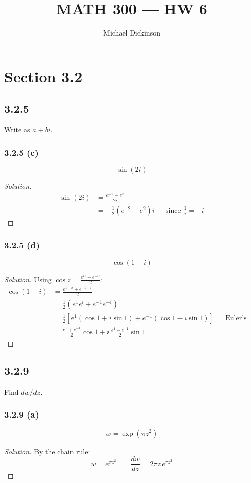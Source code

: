 \documentclass{article}
\title{MATH 300 --- HW 6}
\author{Michael Dickinson}
\date{}
\newenvironment{solution}{
\begin{proof}[Solution]}{
\end{proof}}
\begin{document}
\maketitle

\section*{Section 3.2}

\subsection*{3.2.5}
Write as $a + bi$.

\subsubsection*{3.2.5 (c)}
\[ \sin(2i) \]
\begin{solution}
  \begin{align*}
    \sin(2i) & = \frac{e^{-2}-e^{2}}{2i} \\
    & = -\frac{1}{2}\left(e^{-2}-e^{2}\right)i && \text{since } \frac{1}{i}=-i
  \end{align*}
\end{solution}

\subsubsection*{3.2.5 (d)}
\[ \cos(1 - i) \]
\begin{solution}
  Using $\cos z=\frac{e^{iz}+e^{-iz}}{2}$:
  \begin{align*}
    \cos(1-i) & = \frac{e^{1+i}+e^{-1-i}}{2} \\
    & = \frac{1}{2}\left(e^{1}e^{i}+e^{-1}e^{-i}\right) \\
    & = \frac{1}{2}\left[e^{1}(\cos 1+i\sin 1)+e^{-1}(\cos 1-i\sin 1)\right] && \text{Euler's formula} \\
    & = \frac{e^{1}+e^{-1}}{2}\cos 1+i\,\frac{e^{1}-e^{-1}}{2}\sin 1
  \end{align*}
\end{solution}

\subsection*{3.2.9}
Find $dw/dz$.

\subsubsection*{3.2.9 (a)}
\[ w = \exp(\pi z^2) \]
\begin{solution}
  By the chain rule:
  \[
    w=e^{\pi z^2} \qquad \frac{dw}{dz}=2\pi z\,e^{\pi z^2}
  \]
\end{solution}
\end{document}
